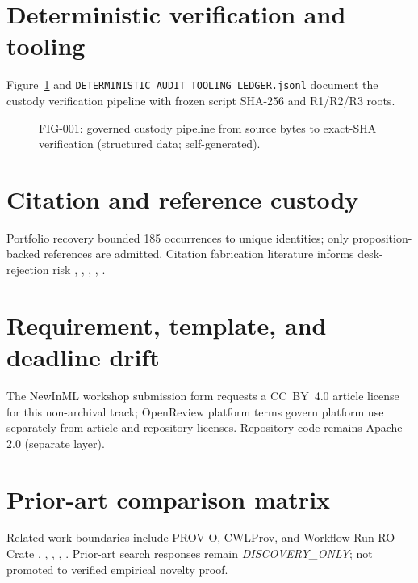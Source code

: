 \section{Deterministic verification and tooling}
\label{app:tooling}
Figure~\ref{fig:custody-pipeline} and \texttt{DETERMINISTIC\_AUDIT\_TOOLING\_LEDGER.jsonl} document the custody verification pipeline with frozen script SHA-256 and R1/R2/R3 roots.

\begin{figure}[ht]
  \centering
  \caption{FIG-001: governed custody pipeline from source bytes to exact-SHA verification (structured data; self-generated).}
  \label{fig:custody-pipeline}
\end{figure}

\section{Citation and reference custody}
\label{app:citations}
Portfolio recovery bounded 185 occurrences to unique identities; only proposition-backed references are admitted. Citation fabrication literature informs desk-rejection risk \cite{kuhn2014trusty}, \cite{walters2023fabrication}, \cite{khan2019cwlprov}, \cite{leo2024rocrote}, \cite{lebo2013provo}.

\section{Requirement, template, and deadline drift}
\label{app:requirements}
The NewInML workshop submission form requests a CC~BY~4.0 article license for this non-archival track; OpenReview platform terms govern platform use separately from article and repository licenses. Repository code remains Apache-2.0 (separate layer).

\section{Prior-art comparison matrix}
\label{app:priorart}
Related-work boundaries include PROV-O, CWLProv, and Workflow Run RO-Crate \cite{kuhn2014trusty}, \cite{walters2023fabrication}, \cite{khan2019cwlprov}, \cite{leo2024rocrote}, \cite{lebo2013provo}. Prior-art search responses remain \emph{DISCOVERY\_ONLY}; not promoted to verified empirical novelty proof.

